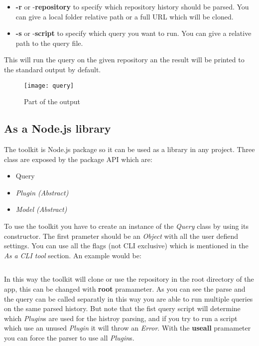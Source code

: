 \begin{itemize}
	\item \textbf{-r} or -\textbf{repository} to specify which repository history should be parsed. You can give a local folder relative path or a full URL which will be cloned.
	\item \textbf{-s} or -\textbf{script} to specify which query you want to run. You can give a relative path to the query file.
\end{itemize}

This will run the query on the given repository an the result will be printed to the standard output by default.

\begin{figure}[H]
	\centering
	\texttt{[image: query]}
	\caption{Part of the output}
	\label{fig:fig-query}
\end{figure}


\subsection{As a Node.js library}

The toolkit is Node.js package so it can be used as a library in any project.
Three class are exposed by the package API which are:

\begin{itemize}
	\item Query
	\item \textit{Plugin (Abstract)}
	\item \textit{Model (Abstract)}
\end{itemize}

To use the toolkit you have to create an instance of the \textit{Query} class by using its constructor.
The first prameter should be an \textit{Object} with all the user defiend settings. 
You can use all the flags (not CLI exclusive) which is mentioned in the \textit{As a CLI tool} section.
An example would be:

\begin{lstlisting}

\end{lstlisting}

In this way the toolkit will clone or use the repository in the root directory of the app, this can be changed with \textbf{root} pramameter.
As you can see the parse and the query can be called separatly in this way you are able to run multiple queries on the same parsed history.
But note that the fist query script will determine which \textit{Plugin}s are used for the histroy parsing, and if you try to run a script which
use an unused \textit{Plugin} it will throw an \textit{Error}. With the \textbf{useall} pramameter you can force the parser to use all \textit{Plugin}s.


